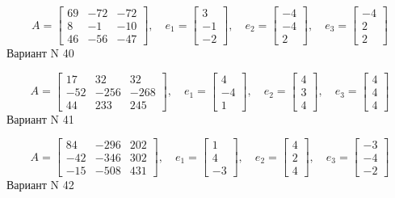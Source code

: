 \documentclass[11pt]{report}
\begin{document}
$$A = \left[\begin{matrix}69 & -72 & -72\\8 & -1 & -10\\46 & -56 & -47\end{matrix}\right],\quad e_1 = \left[\begin{matrix}3\\-1\\-2\end{matrix}\right],\quad e_2 = \left[\begin{matrix}-4\\-4\\2\end{matrix}\right],\quad e_3 = \left[\begin{matrix}-4\\2\\2\end{matrix}\right]$$Вариант N 40

$$A = \left[\begin{matrix}17 & 32 & 32\\-52 & -256 & -268\\44 & 233 & 245\end{matrix}\right],\quad e_1 = \left[\begin{matrix}4\\-4\\1\end{matrix}\right],\quad e_2 = \left[\begin{matrix}4\\3\\4\end{matrix}\right],\quad e_3 = \left[\begin{matrix}4\\4\\4\end{matrix}\right]$$Вариант N 41

$$A = \left[\begin{matrix}84 & -296 & 202\\-42 & -346 & 302\\-15 & -508 & 431\end{matrix}\right],\quad e_1 = \left[\begin{matrix}1\\4\\-3\end{matrix}\right],\quad e_2 = \left[\begin{matrix}4\\2\\4\end{matrix}\right],\quad e_3 = \left[\begin{matrix}-3\\-4\\-2\end{matrix}\right]$$Вариант N 42
\end{document}
